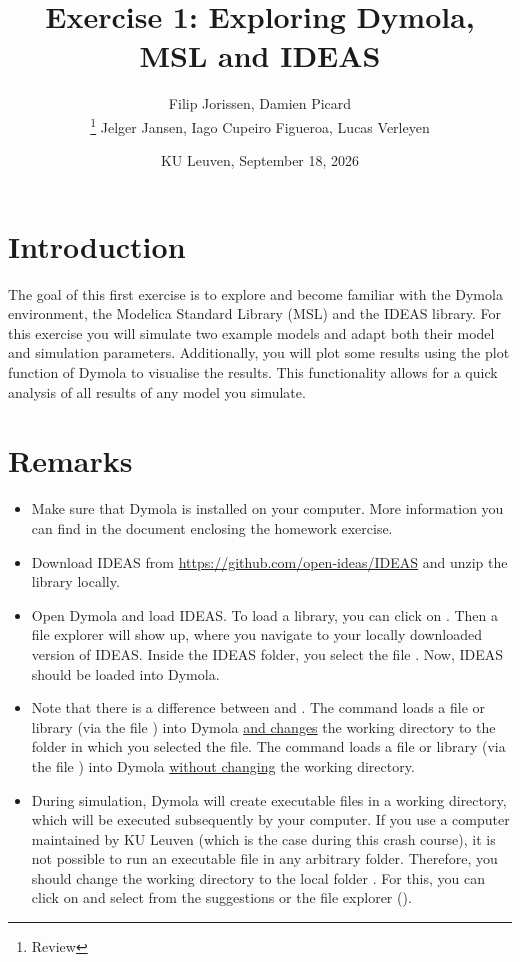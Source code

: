 \documentclass[10pt,a4paper]{article}
\begin{document}
\title{Exercise 1: Exploring Dymola, MSL and IDEAS}
\author{Filip Jorissen, Damien Picard \\  \thanks{Review} Jelger Jansen, Iago Cupeiro Figueroa, Lucas Verleyen}
\date{KU Leuven, September 18, 2026}
\maketitle

\doclicenseThis

\section*{Introduction}
The goal of this first exercise is to explore and become familiar with the Dymola environment, the Modelica Standard Library (MSL) and the IDEAS library. For this exercise you will simulate two example models and adapt both their model and simulation parameters. Additionally, you will plot some results using the plot function of Dymola to visualise the results. This functionality allows for a quick analysis of all results of any model you simulate. 

\section*{Remarks}
 
\begin{itemize}
	\item Make sure that Dymola is installed on your computer. More information you can find in the document enclosing the homework exercise.
	\item Download IDEAS from \href{https://github.com/open-ideas/IDEAS}{https://github.com/open-ideas/IDEAS} and unzip the library locally.
	\item Open Dymola and load IDEAS. To load a library, you can click on . Then a file explorer will show up, where you navigate to your locally downloaded version of IDEAS. Inside the IDEAS folder, you select the file . Now, IDEAS should be loaded into Dymola.
	\item Note that there is a difference between  and . The command  loads a file or library (via the file ) into Dymola \underline{and changes} the working directory to the folder in which you selected the file. The command  loads a file or library (via the file ) into Dymola \underline{without changing} the working directory.
	\item During simulation, Dymola will create executable files in a working directory, which will be executed subsequently by your computer. If you use a computer maintained by KU Leuven (which is the case during this crash course), it is not possible to run an executable file in any arbitrary folder. Therefore, you should change the working directory to the local folder . For this, you can click on  and select  from the suggestions or the file explorer ().
\end{itemize}
\end{document}
